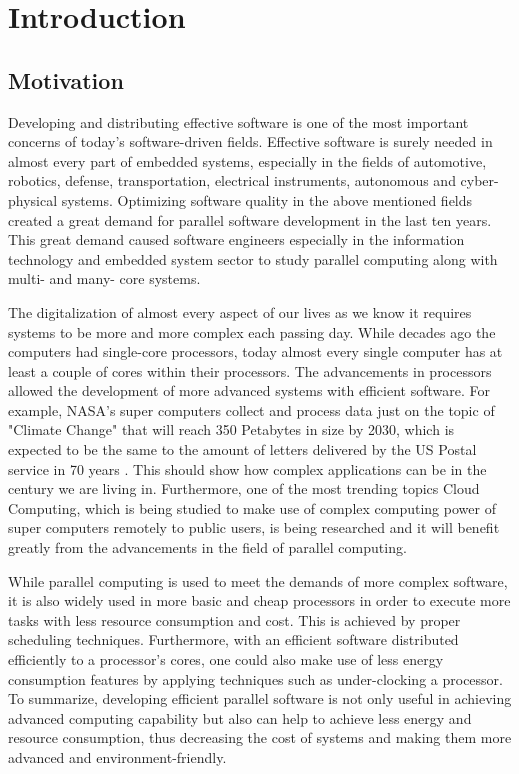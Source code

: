
\chapter{Introduction} \label{introductionchapter}
\section{Motivation}
Developing and distributing effective software is one of the most important concerns of today's software-driven fields. Effective software is surely needed in almost every part of embedded systems, especially in the fields of automotive, robotics, defense, transportation, electrical instruments, autonomous and cyber-physical systems. Optimizing software quality in the above mentioned fields created a great demand for parallel software development in the last ten years. This great demand caused software engineers especially in the information technology and embedded system sector to study parallel computing along with multi- and many- core systems.

The digitalization of almost every aspect of our lives as we know it requires systems to be more and more complex each passing day. While decades ago the computers had single-core processors, today almost every single computer has at least a couple of cores within their processors. The advancements in processors allowed the development of more advanced systems with efficient software. For example, NASA's super computers collect and process data just on the topic of "Climate Change" that will reach 350 Petabytes in size by 2030, which is expected to be the same to the amount of letters delivered by the US Postal service in 70 years \cite{nasachallenge}. This should show how complex applications can be in the century we are living in. Furthermore, one of the most trending topics Cloud Computing, which is being studied to make use of complex computing power of super computers remotely to public users, is being researched and it will benefit greatly from the advancements in the field of parallel computing.

While parallel computing is used to meet the demands of more complex software, it is also widely used in more basic and cheap processors in order to execute more tasks with less resource consumption and cost. This is achieved by proper scheduling techniques. Furthermore, with an efficient software distributed efficiently to a processor's cores, one could also make use of less energy consumption features by applying techniques such as under-clocking a processor. To summarize, developing efficient parallel software is not only useful in achieving advanced computing capability but also can help to achieve less energy and resource consumption, thus decreasing the cost of systems and making them more advanced and environment-friendly.

